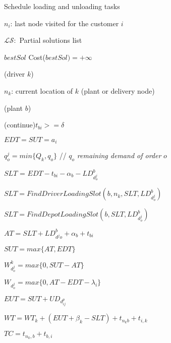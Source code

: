 \documentclass{article}
\begin{document}
{
    {\small
        \begin{algorithm}[H]
            \caption{Schedule loading and unloading tasks }
            \label{alg_ScheduleTask}
            \LinesNumbered
            \setcounter{AlgoLine}{0}
            
            {
            $n_i$: last node visited for the customer $i$ 

            $\mathcal{LS}:$ Partial solutions list
            
            $bestSol$ Cost($bestSol)= +\infty$
            
            \ForEach(driver $k$){}
            {
                $n_k$: current location of $k$ (plant or delivery node)
                
                \ForEach(plant $b$){}
                {
                    
                    \uIf(continue){$t_{bi} >= \delta $}{      }
                    
                    $EDT=SUT=a_i$


            $q^j_{o}=min\{Q_k,q_o \}$ // $q_o$ \textit{remaining demand of order} $o$

            $SLT$ = $EDT - t_{bi} - \alpha_b - LD^b_{d^j_{o}} $
        
            $SLT = FindDriverLoadingSlot(b, n_k, SLT, LD^b_{d^j_{o}})$
                    
            $SLT = FindDepotLoadingSlot(b, SLT, LD^b_{d^j_{o}})$

            $AT =  SLT + LD^b_{d^j{o}} + \alpha_b + t_{bi}$

            $SUT = max\{AT, EDT\}$

            $W^k_{d^j_o}= max\{0,SUT - AT\}$

            $W_{d^j_o}= max\{0,AT - EDT - \lambda_i\}$

            $EUT = SUT + UD_{d^p_{ij}} $

            $WT = WT_k + (EUT + \beta_k - SLT) + t_{n_kb} + t_{i,k}$

            $TC = t_{n_k,b} + t_{b,i}$  %

            }
            }
            }
        \end{algorithm}
    }
}
\end{document}
